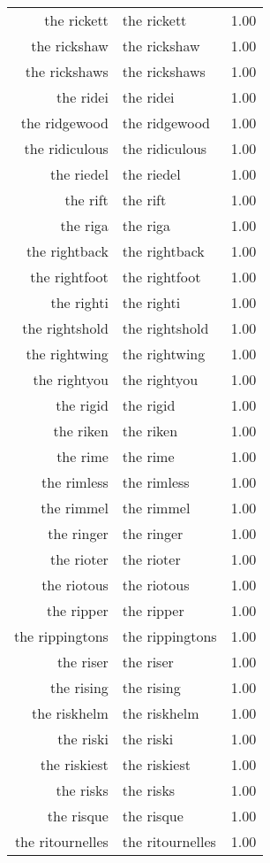 \begin{table}[ht]
\begin{tabular}{rlr}
  the rickett & the rickett & 1.00 \\ 
  the rickshaw & the rickshaw & 1.00 \\ 
  the rickshaws & the rickshaws & 1.00 \\ 
  the ridei & the ridei & 1.00 \\ 
  the ridgewood & the ridgewood & 1.00 \\ 
  the ridiculous & the ridiculous & 1.00 \\ 
  the riedel & the riedel & 1.00 \\ 
  the rift & the rift & 1.00 \\ 
  the riga & the riga & 1.00 \\ 
  the rightback & the rightback & 1.00 \\ 
  the rightfoot & the rightfoot & 1.00 \\ 
  the righti & the righti & 1.00 \\ 
  the rightshold & the rightshold & 1.00 \\ 
  the rightwing & the rightwing & 1.00 \\ 
  the rightyou & the rightyou & 1.00 \\ 
  the rigid & the rigid & 1.00 \\ 
  the riken & the riken & 1.00 \\ 
  the rime & the rime & 1.00 \\ 
  the rimless & the rimless & 1.00 \\ 
  the rimmel & the rimmel & 1.00 \\ 
  the ringer & the ringer & 1.00 \\ 
  the rioter & the rioter & 1.00 \\ 
  the riotous & the riotous & 1.00 \\ 
  the ripper & the ripper & 1.00 \\ 
  the rippingtons & the rippingtons & 1.00 \\ 
  the riser & the riser & 1.00 \\ 
  the rising & the rising & 1.00 \\ 
  the riskhelm & the riskhelm & 1.00 \\ 
  the riski & the riski & 1.00 \\ 
  the riskiest & the riskiest & 1.00 \\ 
  the risks & the risks & 1.00 \\ 
  the risque & the risque & 1.00 \\ 
  the ritournelles & the ritournelles & 1.00 \\ 

\end{tabular}
\end{table}
